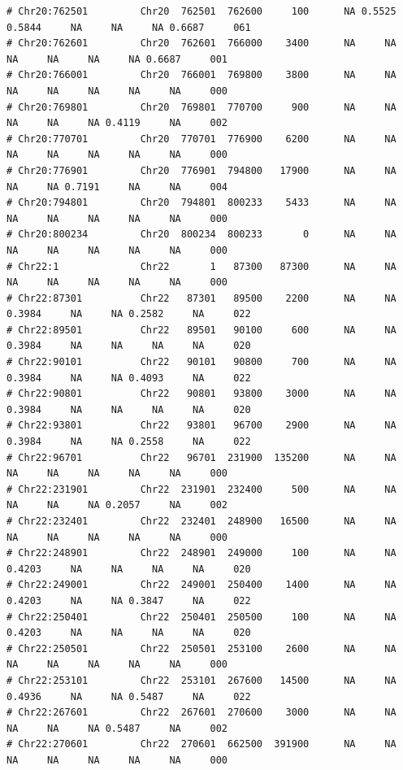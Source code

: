 \documentclass{article}\usepackage[]{graphicx}\usepackage[]{color}
\makeatletter
\newenvironment{kframe}{%
 \def\at@end@of@kframe{}%
 \ifinner\ifhmode%
  \def\at@end@of@kframe{\end{minipage}}%
  \begin{minipage}{\columnwidth}%
 \fi\fi%
 \def\FrameCommand##1{\hskip\@totalleftmargin \hskip-\fboxsep
 \colorbox{shadecolor}{##1}\hskip-\fboxsep
     \hskip-\linewidth \hskip-\@totalleftmargin \hskip\columnwidth}%
 \MakeFramed {\advance\hsize-\width
   \@totalleftmargin\z@ \linewidth\hsize
   \@setminipage}}%
 {\par\unskip\endMakeFramed%
 \at@end@of@kframe}
\newenvironment{knitrout}{}{} %
\makeatother
\begin{document}
\begin{knitrout}
\begin{kframe}
\begin{verbatim}
# Chr20:762501         Chr20  762501  762600     100      NA 0.5525 0.5844     NA     NA     NA 0.6687     061
# Chr20:762601         Chr20  762601  766000    3400      NA     NA     NA     NA     NA     NA 0.6687     001
# Chr20:766001         Chr20  766001  769800    3800      NA     NA     NA     NA     NA     NA     NA     000
# Chr20:769801         Chr20  769801  770700     900      NA     NA     NA     NA     NA 0.4119     NA     002
# Chr20:770701         Chr20  770701  776900    6200      NA     NA     NA     NA     NA     NA     NA     000
# Chr20:776901         Chr20  776901  794800   17900      NA     NA     NA     NA 0.7191     NA     NA     004
# Chr20:794801         Chr20  794801  800233    5433      NA     NA     NA     NA     NA     NA     NA     000
# Chr20:800234         Chr20  800234  800233       0      NA     NA     NA     NA     NA     NA     NA     000
# Chr22:1              Chr22       1   87300   87300      NA     NA     NA     NA     NA     NA     NA     000
# Chr22:87301          Chr22   87301   89500    2200      NA     NA 0.3984     NA     NA 0.2582     NA     022
# Chr22:89501          Chr22   89501   90100     600      NA     NA 0.3984     NA     NA     NA     NA     020
# Chr22:90101          Chr22   90101   90800     700      NA     NA 0.3984     NA     NA 0.4093     NA     022
# Chr22:90801          Chr22   90801   93800    3000      NA     NA 0.3984     NA     NA     NA     NA     020
# Chr22:93801          Chr22   93801   96700    2900      NA     NA 0.3984     NA     NA 0.2558     NA     022
# Chr22:96701          Chr22   96701  231900  135200      NA     NA     NA     NA     NA     NA     NA     000
# Chr22:231901         Chr22  231901  232400     500      NA     NA     NA     NA     NA 0.2057     NA     002
# Chr22:232401         Chr22  232401  248900   16500      NA     NA     NA     NA     NA     NA     NA     000
# Chr22:248901         Chr22  248901  249000     100      NA     NA 0.4203     NA     NA     NA     NA     020
# Chr22:249001         Chr22  249001  250400    1400      NA     NA 0.4203     NA     NA 0.3847     NA     022
# Chr22:250401         Chr22  250401  250500     100      NA     NA 0.4203     NA     NA     NA     NA     020
# Chr22:250501         Chr22  250501  253100    2600      NA     NA     NA     NA     NA     NA     NA     000
# Chr22:253101         Chr22  253101  267600   14500      NA     NA 0.4936     NA     NA 0.5487     NA     022
# Chr22:267601         Chr22  267601  270600    3000      NA     NA     NA     NA     NA 0.5487     NA     002
# Chr22:270601         Chr22  270601  662500  391900      NA     NA     NA     NA     NA     NA     NA     000

\end{verbatim}
\end{kframe}
\end{knitrout}
\end{document}
